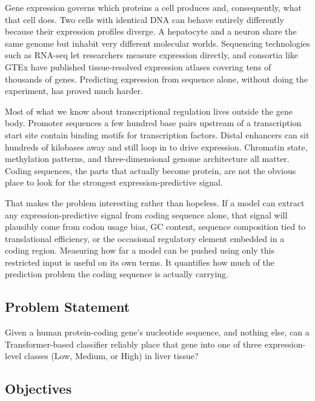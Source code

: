 \documentclass[11pt,a4paper]{article}
\begin{document}
Gene expression governs which proteins a cell produces and, consequently, what that cell does. Two cells with identical DNA can behave entirely differently because their expression profiles diverge. A hepatocyte and a neuron share the same genome but inhabit very different molecular worlds. Sequencing technologies such as RNA-seq let researchers measure expression directly, and consortia like GTEx have published tissue-resolved expression atlases covering tens of thousands of genes. Predicting expression from sequence alone, without doing the experiment, has proved much harder.

Most of what we know about transcriptional regulation lives outside the gene body. Promoter sequences a few hundred base pairs upstream of a transcription start site contain binding motifs for transcription factors. Distal enhancers can sit hundreds of kilobases away and still loop in to drive expression. Chromatin state, methylation patterns, and three-dimensional genome architecture all matter. Coding sequences, the parts that actually become protein, are not the obvious place to look for the strongest expression-predictive signal.

That makes the problem interesting rather than hopeless. If a model can extract any expression-predictive signal from coding sequence alone, that signal will plausibly come from codon usage bias, GC content, sequence composition tied to translational efficiency, or the occasional regulatory element embedded in a coding region. Measuring how far a model can be pushed using only this restricted input is useful on its own terms. It quantifies how much of the prediction problem the coding sequence is actually carrying.

\subsection{Problem Statement}

Given a human protein-coding gene's nucleotide sequence, and nothing else, can a Transformer-based classifier reliably place that gene into one of three expression-level classes (Low, Medium, or High) in liver tissue?

\subsection{Objectives}
\end{document}
